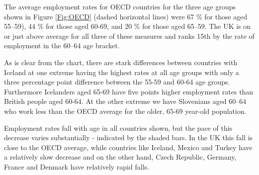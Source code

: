 \documentclass[11 pt, a4paper]{report}
\begin{document}
The average employment rates for OECD countries for the three age groups shown in Figure \ref{Fig:OECD} (dashed horizontal lines)  were 67 \% for those aged 55--59), 44 \% for those aged 60-69, and 20 \% for those aged 65--59. The UK is on or just above average for all three of these measures and ranks 15th by the rate of employment in the 60--64 age bracket. 

As is clear from the chart, there are stark differences between countries with Iceland at one extreme having the highest rates at all age groups with only a three percentage point difference between the 55-59 and 60-64 age groups. Furthermore Icelanders aged 65-69 have five points higher employment rates than British people aged 60-64. At the other extreme we have Slovenians aged 60--64 who work less than the OECD average for the older, 65-69 year-old population. 

Employment rates fall with age in all countries shown, but the pace of this decrease varies substantially - indicated by the shaded bars.  In the UK this fall is close to the OECD average, while countries like Iceland, Mexico and Turkey have a relatively slow decrease and on the other hand, Czech Republic,  Germany, France and Denmark have relatively rapid falls. 
\clearpage
\vspace{-1cm}
\end{document}
